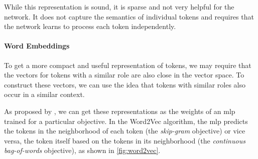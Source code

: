 While this representation is sound, it is sparse and not very helpful for the network. It does not capture the semantics of individual tokens and requires that the network learns to process each token independently.

\paragraph{Word Embeddings} To get a more compact and useful representation of tokens, we may require that the vectors for tokens with a similar role are also close in the vector space. To construct these vectors, we can use the idea that tokens with similar roles also occur in a similar context.

As proposed by \citet{mikolov2013distributed}, we can get these representations as the weights of an \ac{mlp} trained for a particular objective. In the Word2Vec algorithm, the \ac{mlp} predicts the tokens in the neighborhood of each token (the \emph{skip-gram} objective) or vice versa, the token itself based on the tokens in its neighborhood (the \textit{continuous bag-of-words} objective), as shown in \autoref{fig:word2vec}.

